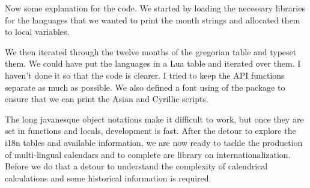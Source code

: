 Now some explanation for the code. We started by loading the necessary libraries for the languages that we wanted to print the month strings and allocated them to local variables.

We then iterated through the twelve months of the gregorian table and typeset them. We could have put the languages in a Lua table and iterated over them. I haven't done it so that the code is clearer. I tried to keep the API functions separate as much as possible. We also defined a font using  of the  package to ensure that we can print the Asian and Cyrillic scripts.

The long javanesque object notations make it difficult to work, but once they are set in functions and locals, development is fast. After the detour to explore the i18n tables and available information, we are now ready to tackle the production of multi-lingual calendars and to complete are library on internationalization. Before we do that a detour to understand
the complexity of calendrical calculations and some historical information is required.
\vfill




